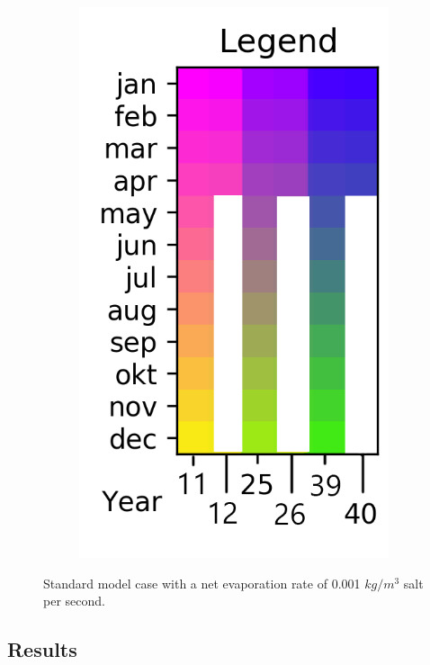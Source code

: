 \documentclass[twocolumn]{article}
\begin{document}
\begin{figure}
\begin{subfigure}[h]{0.20\textwidth}
\includegraphics[width=\linewidth,keepaspectratio]{40yr_reduced_Legend.png}
\end{subfigure}\hfill
\caption{Standard model case with a net evaporation rate of 0.001 $kg/m^3$ salt per second.}
\label{fig:net_evap}
\end{figure}



\subsection{Results}
\end{document}
